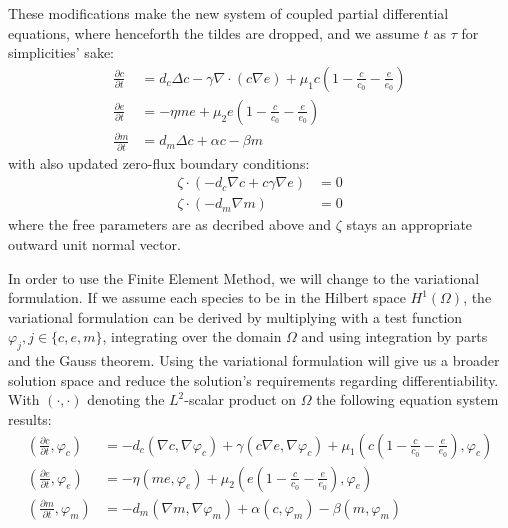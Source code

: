 These modifications make the new system of coupled partial differential equations, where henceforth the tildes are dropped, and we assume $t$ as $\tau$ for simplicities' sake:
\begin{align}
	\frac{\partial c}{\partial t} &= d_c \Delta c - \gamma \nabla \cdot (c\nabla e)  + \mu_1 c\left(1-\frac{c}{c_0}-\frac{e}{e_0}\right)\label{eq:6}\\
	\frac{\partial e}{\partial t} &= -\eta m e  + \mu_2 e\left(1-\frac{c}{c_0}-\frac{e}{e_0}\right)\label{eq:7}\\
	\frac{\partial m}{\partial t} &= d_m \Delta c + \alpha c - \beta m\label{eq:8}
\end{align}
with also updated zero-flux boundary conditions:
\begin{align}
	\zeta \cdot (-d_c \nabla c + c \gamma \nabla e) &= 0\label{eq:9}\\
	\zeta \cdot (-d_m\nabla m ) &= 0\label{eq:10}
\end{align}
where the free parameters are as decribed above and $\zeta$ stays an appropriate outward unit normal vector.
 
In order to use the Finite Element Method, we will change to the variational formulation. If we assume each species to be in the Hilbert space $H^1(\Omega)$, the variational formulation can be derived by multiplying with a test function $\varphi_j, j\in \{c,e,m\}$, integrating over the domain $\Omega$ and using integration by parts and the Gauss theorem. Using the variational formulation will give us a broader solution space and reduce the solution's requirements regarding differentiability. With $\left(\cdot, \cdot\right)$ denoting the $L^2$-scalar product on $\Omega$ the following equation system results:
\begin{align}
    \left(\frac{\partial c}{\partial t}, \varphi_c\right) &=
        - d_c\left(\nabla c, \nabla \varphi_c\right) + \gamma \left(c\nabla e, \nabla \varphi_c\right) + \mu_1 \left(c \left(1-\frac{c}{c_0} - \frac{e}{e_0}\right), \varphi_c\right) \label{eq:11}\\
    \left(\frac{\partial e}{\partial t}, \varphi_e\right) &=  -\eta \left( me, \varphi_e\right) + \mu_2 \left(e\left(1-\frac{c}{c_0}-\frac{e}{e_0}\right),\varphi_e\right) \label{eq:12}\\
    \left(\frac{\partial m}{\partial t}, \varphi_m\right) &= -d_m \left(\nabla m,\nabla \varphi_m\right) + \alpha \left(c,\varphi_m\right) - \beta \left(m,\varphi_m\right) \label{eq:13}
\end{align}
